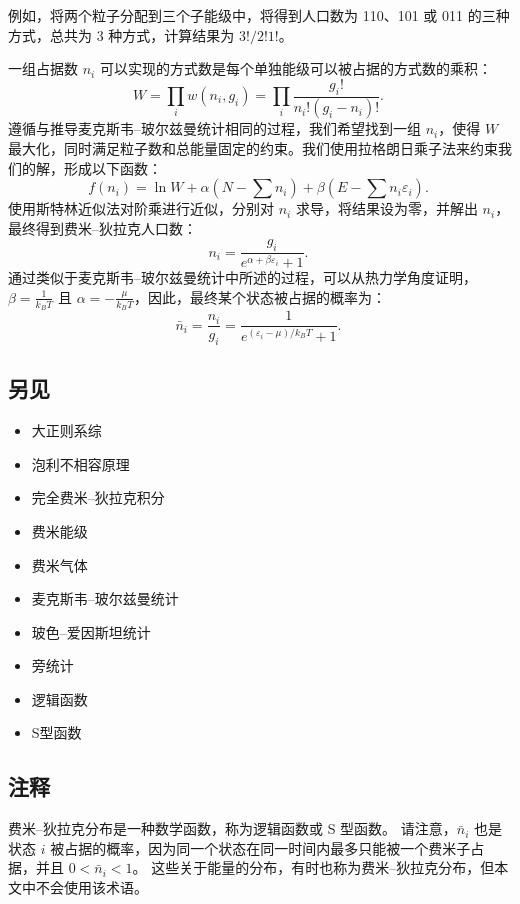 例如，将两个粒子分配到三个子能级中，将得到人口数为 110、101 或 011 的三种方式，总共为 3 种方式，计算结果为 \(3!/2!1!\)。

一组占据数 \( n_i \) 可以实现的方式数是每个单独能级可以被占据的方式数的乘积：
\[
W = \prod_i w(n_i, g_i) = \prod_i \frac{g_i!}{n_i!(g_i - n_i)!}.~
\]
遵循与推导麦克斯韦–玻尔兹曼统计相同的过程，我们希望找到一组 \( n_i \)，使得 \( W \) 最大化，同时满足粒子数和总能量固定的约束。我们使用拉格朗日乘子法来约束我们的解，形成以下函数：
\[
f(n_i) = \ln W + \alpha (N - \sum n_i) + \beta (E - \sum n_i \varepsilon_i).~
\]
使用斯特林近似法对阶乘进行近似，分别对 \( n_i \) 求导，将结果设为零，并解出 \( n_i \)，最终得到费米–狄拉克人口数：
\[
n_i = \frac{g_i}{e^{\alpha + \beta \varepsilon_i} + 1}.~
\]
通过类似于麦克斯韦–玻尔兹曼统计中所述的过程，可以从热力学角度证明，\( \beta = \frac{1}{k_B T} \) 且 \( \alpha = -\frac{\mu}{k_B T} \)，因此，最终某个状态被占据的概率为：
\[
\bar{n}_i = \frac{n_i}{g_i} = \frac{1}{e^{(\varepsilon_i - \mu)/k_B T} + 1}.~
\]
\subsection{另见}
\begin{itemize}
\item 大正则系综  
\item 泡利不相容原理  
\item 完全费米–狄拉克积分  
\item 费米能级  
\item 费米气体  
\item 麦克斯韦–玻尔兹曼统计  
\item 玻色–爱因斯坦统计  
\item 旁统计  
\item 逻辑函数  
\item S型函数
\end{itemize}
\subsection{注释}  
费米–狄拉克分布是一种数学函数，称为逻辑函数或 S 型函数。  
请注意，\( \bar{n}_i \) 也是状态 \( i \) 被占据的概率，因为同一个状态在同一时间内最多只能被一个费米子占据，并且 \( 0 < \bar{n}_i < 1 \)。  
这些关于能量的分布，有时也称为费米–狄拉克分布，但本文中不会使用该术语。